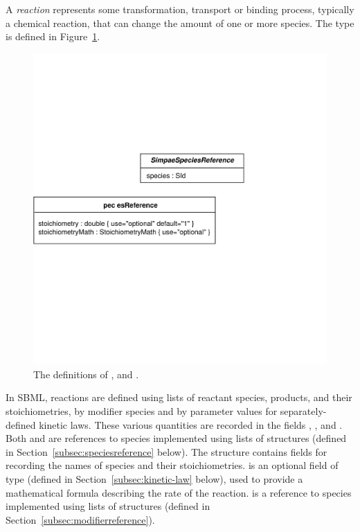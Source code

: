 \documentclass[10pt]{cekarticle}
\newcommand{\vref}[1]{\ref{#1}}
\begin{document}
A \emph{reaction} represents some transformation, transport or
binding process, typically a chemical reaction, that can change
the amount of one or more species.  The  type is
defined in Figure~\vref{fig:reaction}.

\begin{figure}[htb]
  \centering
  \includegraphics[scale = 0.68]{reaction}
  \caption{The definitions of ,  and
    .}
  \label{fig:reaction}
\end{figure}

In SBML, reactions are defined using lists of reactant species,
products, and their stoichiometries, by modifier species and by
parameter values for separately-defined kinetic laws.  These
various quantities are recorded in the fields ,
,  and .  Both
 and  are references to species
implemented using lists of  structures
(defined in Section~\ref{subsec:speciesreference} below).  The
 structure contains fields for recording
the names of species and their stoichiometries.
 is an optional field of type
 (defined in Section~\ref{subsec:kinetic-law}
below), used to provide a mathematical formula describing the rate
of the reaction.   is a reference to species
implemented using lists of  structures
(defined in Section~\ref{subsec:modifierreference}).
\end{document}
